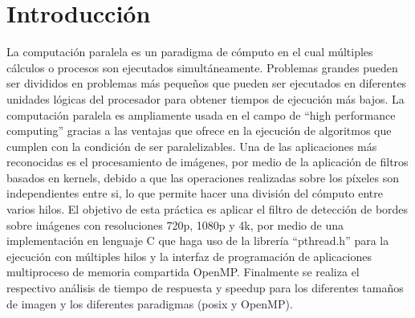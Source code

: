 





\maketitle



\section{Introducción}
La computación paralela es un paradigma de cómputo en el cual múltiples cálculos o procesos son ejecutados simultáneamente. Problemas grandes pueden ser divididos en problemas más pequeños que pueden ser ejecutados en diferentes unidades lógicas del procesador para obtener tiempos de ejecución más bajos. La computación paralela es ampliamente usada en el campo de ``high performance computing'' gracias a las ventajas que ofrece en la ejecución de algoritmos que cumplen con la condición de ser paralelizables. Una de las aplicaciones más reconocidas es el procesamiento de imágenes, por medio de la aplicación de filtros basados en kernels, debido a que las operaciones realizadas sobre los píxeles son independientes entre si, lo que permite hacer una división del cómputo entre varios hilos. El objetivo de esta práctica es aplicar el filtro de detección de bordes sobre imágenes con resoluciones 720p, 1080p y 4k, por medio de una implementación en lenguaje C que haga uso de la librería ``pthread.h'' para la ejecución con múltiples hilos y la interfaz de programación de aplicaciones multiproceso de memoria compartida OpenMP. Finalmente se realiza el respectivo análisis de tiempo de respuesta y speedup para los diferentes tamaños de imagen y los diferentes paradigmas (posix y OpenMP).

